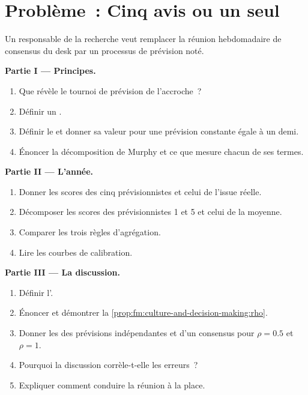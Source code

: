 \section{Problème~: Cinq avis ou un seul}

\begin{problem}\label{pb:fm:culture-and-decision-making:1}
Un responsable de la recherche veut remplacer la réunion hebdomadaire de consensus du desk par un processus de prévision noté.

\medskip\noindent\textbf{Partie I --- Principes.}
\begin{enumerate}
\item Que révèle le tournoi de prévision de l'accroche~?
\item Définir un .
\item Définir le  et donner sa valeur pour une prévision constante égale à un demi.
\item Énoncer la décomposition de Murphy et ce que mesure chacun de ses termes.
\end{enumerate}

\medskip\noindent\textbf{Partie II --- L'année.}
\begin{enumerate}[resume]
\item Donner les scores des cinq prévisionnistes et celui de l'issue réelle.
\item Décomposer les scores des prévisionnistes 1 et 5 et celui de la moyenne.
\item Comparer les trois règles d'agrégation.
\item Lire les courbes de calibration.
\end{enumerate}

\medskip\noindent\textbf{Partie III --- La discussion.}
\begin{enumerate}[resume]
\item Définir l'.
\item Énoncer et démontrer la \cref{prop:fm:culture-and-decision-making:rho}.
\item Donner les  des prévisions indépendantes et d'un consensus pour $\rho=0.5$ et $\rho=1$.
\item Pourquoi la discussion corrèle-t-elle les erreurs~?
\item Expliquer comment conduire la réunion à la place.
\end{enumerate}


\end{problem}
